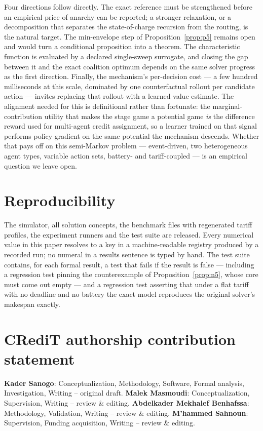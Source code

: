 \documentclass[preprint, 3p, review, 12pt]{elsarticle}
\theoremstyle{definition}
\begin{document}
Four directions follow directly. The exact reference must be strengthened before an
empirical price of anarchy can be reported; a stronger relaxation, or a decomposition that
separates the state-of-charge recursion from the routing, is the natural target. The
min-envelope step of Proposition~\ref{prop:p5} remains open and would turn a conditional
proposition into a theorem. The characteristic function is evaluated by a declared
single-sweep surrogate, and closing the gap between it and the exact coalition optimum
depends on the same solver progress as the first direction. Finally, the mechanism's
per-decision cost --- a few hundred milliseconds at this scale, dominated by one
counterfactual rollout per candidate action --- invites replacing that rollout with a learned
value estimate. The alignment needed for this is definitional rather than fortunate: the
marginal-contribution utility that makes the stage game a potential game \emph{is} the
difference reward used for multi-agent credit assignment, so a learner trained on that signal
performs policy gradient on the same potential the mechanism descends. Whether that pays off
on this semi-Markov problem --- event-driven, two heterogeneous agent types, variable action
sets, battery- and tariff-coupled --- is an empirical question we leave open.

\section*{Reproducibility}
The simulator, all solution concepts, the benchmark files with regenerated tariff profiles,
the experiment runners and the test suite are released. Every numerical value in this paper
resolves to a key in a machine-readable registry produced by a recorded run; no numeral in a
results sentence is typed by hand. The test suite contains, for each formal result, a test
that fails if the result is false --- including a regression test pinning the counterexample
of Proposition~\ref{prop:n5}, whose core must come out empty --- and a regression test
asserting that under a flat tariff with no deadline and no battery the exact model reproduces
the original solver's makespan exactly.

\section*{CRediT authorship contribution statement}
\textbf{Kader Sanogo}: Conceptualization, Methodology, Software, Formal analysis,
Investigation, Writing -- original draft. \textbf{Malek Masmoudi}: Conceptualization,
Supervision, Writing -- review \& editing. \textbf{Abdelkader Mekhalef Benhafssa}:
Methodology, Validation, Writing -- review \& editing. \textbf{M'hammed Sahnoun}:
Supervision, Funding acquisition, Writing -- review \& editing.
\end{document}

